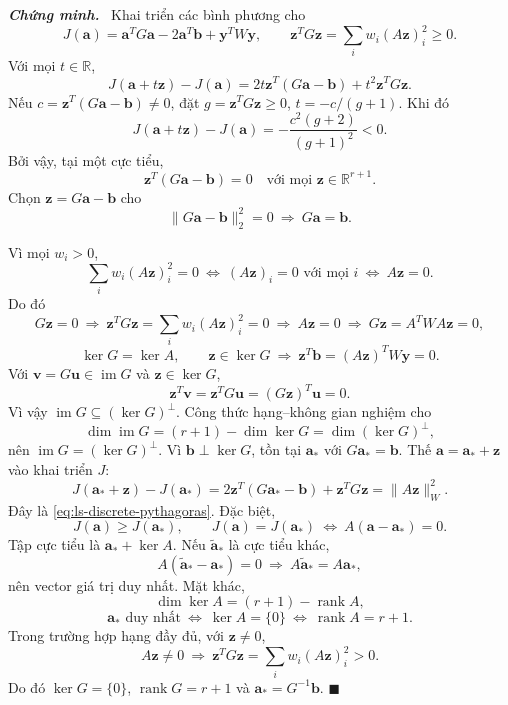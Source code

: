 \documentclass[12pt,a4paper,oneside]{book}
\numberwithin{algorithm}{chapter}
\theoremstyle{definition}
\newenvironment{chungminh}{\par\medskip\noindent\textbf{\textit{\color{mainblue}Chứng minh.}}\ }{\hfill$\blacksquare$\par\medskip}
\newcommand{\R}{\mathbb{R}}
\begin{document}
\begin{chungminh}
Khai triển các bình phương cho
\[
 J(\mathbf a)=\mathbf a^TG\mathbf a-2\mathbf a^T\mathbf b+\mathbf y^TW\mathbf y,
 \qquad\mathbf z^TG\mathbf z=\sum_iw_i(A\mathbf z)_i^2\geq0.
\]
Với mọi $t\in\R$,
\[
 J(\mathbf a+t\mathbf z)-J(\mathbf a)
 =2t\mathbf z^T(G\mathbf a-\mathbf b)+t^2\mathbf z^TG\mathbf z.
\]
Nếu $c=\mathbf z^T(G\mathbf a-\mathbf b)\ne0$, đặt $g=\mathbf z^TG\mathbf z\geq0$, $t=-c/(g+1)$. Khi đó
\[
 J(\mathbf a+t\mathbf z)-J(\mathbf a)
 =-\frac{c^2(g+2)}{(g+1)^2}<0.
\]
Bởi vậy, tại một cực tiểu,
\[
 \mathbf z^T(G\mathbf a-\mathbf b)=0\quad\text{với mọi }\mathbf z\in\R^{r+1}.
\]
Chọn $\mathbf z=G\mathbf a-\mathbf b$ cho
\[
 \|G\mathbf a-\mathbf b\|_2^2=0
 \ \Longrightarrow\ G\mathbf a=\mathbf b.
\]

Vì mọi $w_i>0$,
\[
 \sum_iw_i(A\mathbf z)_i^2=0
 \ \Longleftrightarrow\
 (A\mathbf z)_i=0\text{ với mọi }i
 \ \Longleftrightarrow\ A\mathbf z=0.
\]
Do đó
\[
 G\mathbf z=0\ \Longrightarrow\
 \mathbf z^TG\mathbf z=\sum_iw_i(A\mathbf z)_i^2=0
 \ \Longrightarrow\ A\mathbf z=0
 \ \Longrightarrow\ G\mathbf z=A^TWA\mathbf z=0,
\]
\[
 \ker G=\ker A,
 \qquad \mathbf z\in\ker G\ \Longrightarrow\ \mathbf z^T\mathbf b=(A\mathbf z)^TW\mathbf y=0.
\]
Với $\mathbf v=G\mathbf u\in\operatorname{im}G$ và $\mathbf z\in\ker G$,
\[
 \mathbf z^T\mathbf v=\mathbf z^TG\mathbf u=(G\mathbf z)^T\mathbf u=0.
\]
Vì vậy $\operatorname{im}G\subseteq(\ker G)^\perp$. Công thức hạng--không gian nghiệm cho
\[
 \dim\operatorname{im}G=(r+1)-\dim\ker G=\dim(\ker G)^\perp,
\]
 nên $\operatorname{im}G=(\ker G)^\perp$. Vì $\mathbf b\perp\ker G$, tồn tại $\mathbf a_*$ với $G\mathbf a_*=\mathbf b$. Thế $\mathbf a=\mathbf a_*+\mathbf z$ vào khai triển $J$:
\[
 J(\mathbf a_*+\mathbf z)-J(\mathbf a_*)
 =2\mathbf z^T(G\mathbf a_*-\mathbf b)+\mathbf z^TG\mathbf z
 =\|A\mathbf z\|_W^2.
\]
Đây là \eqref{eq:ls-discrete-pythagoras}. Đặc biệt,
\[
 J(\mathbf a)\geq J(\mathbf a_*),\qquad
 J(\mathbf a)=J(\mathbf a_*)
 \ \Longleftrightarrow\
 A(\mathbf a-\mathbf a_*)=0.
\]
Tập cực tiểu là $\mathbf a_*+\ker A$. Nếu $\widetilde{\mathbf a}_*$ là cực tiểu khác,
\[
 A(\widetilde{\mathbf a}_*-\mathbf a_*)=0
 \ \Longrightarrow\ A\widetilde{\mathbf a}_*=A\mathbf a_*,
\]
nên vector giá trị duy nhất. Mặt khác,
\[
 \dim\ker A=(r+1)-\operatorname{rank}A,
\]
\[
 \mathbf a_*\text{ duy nhất}
 \ \Longleftrightarrow\ \ker A=\{0\}
 \ \Longleftrightarrow\ \operatorname{rank}A=r+1.
\]
Trong trường hợp hạng đầy đủ, với $\mathbf z\ne0$,
\[
 A\mathbf z\ne0
 \ \Longrightarrow\
 \mathbf z^TG\mathbf z=\sum_iw_i(A\mathbf z)_i^2>0.
\]
Do đó $\ker G=\{0\}$, $\operatorname{rank}G=r+1$ và $\mathbf a_*=G^{-1}\mathbf b$.
\end{chungminh}
\end{document}
